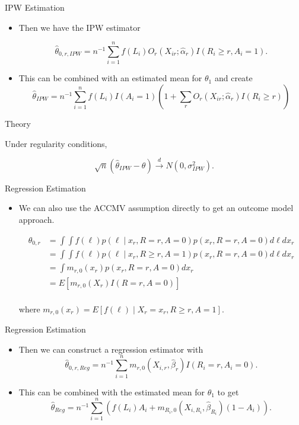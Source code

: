 \documentclass{beamer} %
\begin{document}
\begin{frame}{IPW Estimation}
  \begin{itemize}
    \item Then we have the IPW estimator

      \[\hat \theta_{0, r, IPW} = n^{-1} \sum_{i = 1}^n f(L_i)O_r(X_{ir}; \hat
        \alpha_r) I(R_i \geq r, A_i = 1).\]
      \item This can be combined with an estimated mean for $\theta_1$ and 
        create
        \[\hat \theta_{IPW} = n^{-1} \sum_{i = 1}^n f(L_i)I(A_i = 1)\left(
            1 + \sum_{r} O_r(X_{ir}; \hat \alpha_r) I(R_i \geq r) \right)\]
  \end{itemize}
\end{frame}

\begin{frame}{Theory}
  \begin{theorem}
    Under regularity conditions,

    \[\sqrt n (\hat \theta_{IPW} - \theta) \stackrel{d}{\to} N(0, \sigma_{IPW}^2).\]
  \end{theorem}
\end{frame}

\begin{frame}{Regression Estimation}
  \begin{itemize}
    \item We can also use the ACCMV assumption directly to get an outcome model
      approach.

      \begin{align*}
        \theta_{0,r} 
        &= \int \int f(\ell)p(\ell \mid x_r, R = r, A = 0) p(x_r, R = r, A = 0) d\ell dx_r \\
        &= \int \int f(\ell)p(\ell \mid x_r, R \geq r, A = 1) p(x_r, R = r, A = 0) d\ell dx_r \\
        &= \int m_{r, 0}(x_r) p(x_r, R = r, A = 0) dx_r \\
        &= E[m_{r, 0}(X_r)I(R = r, A = 0)]\\
      \end{align*}

      where $m_{r, 0}(x_r) = E[f(\ell) \mid X_r = x_r, R \geq r, A = 1]$.
  \end{itemize}
\end{frame}

\begin{frame}{Regression Estimation}
  \begin{itemize}
    \item Then we can construct a regression estimator with
      \[\hat \theta_{0,r, Reg} = n^{-1} \sum_{i = 1}^n m_{r,0}(X_{i,r}, \hat
        \beta_r)I(R_i = r, A_i = 0).\]
      \item This can be combined with the estimated mean for $\theta_1$ to get
        \[\hat \theta_{Reg} = n^{-1} \sum_{i = 1}^n (f(L_i)A_i + m_{R_i, 0}(X_{i,
          R_i}, \hat \beta_{R_i})(1 - A_i)).\]
  \end{itemize}
\end{frame}
\end{document}
